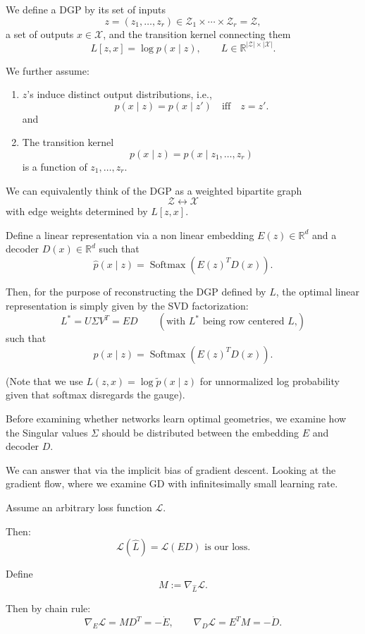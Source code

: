 \documentclass[11pt]{article}
\DeclareMathOperator{\Softmax}{Softmax}
\begin{document}
We define a DGP by its set of inputs
\[
z=(z_1,\ldots,z_r)\in \mathcal Z_1\times\cdots\times\mathcal Z_r=\mathcal Z,
\]
a set of outputs $x\in\mathcal X$, and the transition kernel connecting them
\[
L[z,x]=\log p(x\mid z),
\qquad
L\in\mathbb R^{|\mathcal Z|\times|\mathcal X|}.
\]

We further assume:

\begin{enumerate}
\item $z$'s induce distinct output distributions, i.e.,
\[
p(x\mid z)=p(x\mid z')\quad\text{iff}\quad z=z'.
\]
and

\item The transition kernel
\[
p(x\mid z)=p(x\mid z_1,\ldots,z_r)
\]
is a function of $z_1,\ldots,z_r$.
\end{enumerate}

We can equivalently think of the DGP as a weighted bipartite graph
\[
\mathcal Z\longleftrightarrow\mathcal X
\]
with edge weights determined by $L[z,x]$.

Define a linear representation via a non linear embedding $E(z)\in\mathbb R^d$ and a decoder $D(x)\in\mathbb R^d$ such that
\[
\hat p(x\mid z)=\Softmax\!\left(E(z)^T D(x)\right).
\]

Then, for the purpose of reconstructing the DGP defined by $L$, the optimal linear representation is simply given by the SVD factorization:
\[
L^*=U\Sigma V^T=ED
\qquad
\left(\text{with $L^*$ being row centered $L$,}\right)
\]
such that
\[
p(x\mid z)=\Softmax\!\left(E(z)^T D(x)\right).
\]

(Note that we use $L(z,x)=\log\tilde p(x\mid z)$ for unnormalized log probability given that softmax disregards the gauge).

Before examining whether networks learn optimal geometries, we examine how the Singular values $\Sigma$ should be distributed between the embedding $E$ and decoder $D$.

We can answer that via the implicit bias of gradient descent. Looking at the gradient flow, where we examine GD with infinitesimally small learning rate.

Assume an arbitrary loss function $\mathcal L$.

Then:
\[
\mathcal L(\hat L)=\mathcal L(ED)\text{ is our loss.}
\]

Define
\[
M:=\nabla_{\hat L}\mathcal L.
\]

Then by chain rule:
\[
\nabla_E\mathcal L=MD^T=-\dot E,
\qquad
\nabla_D\mathcal L=E^T M=-\dot D.
\]
\end{document}
